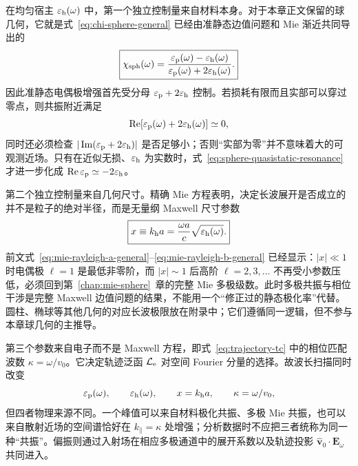 在均匀宿主 $\varepsilon_{\rm h}(\omega)$ 中，第一个独立控制量来自材料本身。对于本章正文保留的球几何，它就是式~\eqref{eq:chi-sphere-general} 已经由准静态边值问题和 Mie 渐近共同导出的
\begin{equation}
\boxed{
\chi_{\rm sph}(\omega)
=\frac{\varepsilon_{\rm p}(\omega)-\varepsilon_{\rm h}(\omega)}
{\varepsilon_{\rm p}(\omega)+2\varepsilon_{\rm h}(\omega)}.}
\label{eq:material-contrast-factors}
\end{equation}
因此准静态电偶极增强首先受分母
$\varepsilon_{\rm p}+2\varepsilon_{\rm h}$ 控制。若损耗有限而且实部可以穿过零点，则共振附近满足
\begin{equation}
\operatorname{Re}\!\left[\varepsilon_{\rm p}(\omega)+2\varepsilon_{\rm h}(\omega)\right]\simeq0,
\label{eq:sphere-quasistatic-resonance}
\end{equation}
同时还必须检查
$|\operatorname{Im}(\varepsilon_{\rm p}+2\varepsilon_{\rm h})|$
是否足够小；否则“实部为零”并不意味着大的可观测近场。只有在近似无损、$\varepsilon_{\rm h}$ 为实数时，式~\eqref{eq:sphere-quasistatic-resonance} 才进一步化成
$\operatorname{Re}\varepsilon_{\rm p}\simeq-2\varepsilon_{\rm h}$。

第二个独立控制量来自几何尺寸。精确 Mie 方程表明，决定长波展开是否成立的并不是粒子的绝对半径，而是无量纲 Maxwell 尺寸参数
\begin{equation}
\boxed{x\equiv k_{\rm h}a
=\frac{\omega a}{c}\sqrt{\varepsilon_{\rm h}(\omega)}.}
\label{eq:size-parameter-general}
\end{equation}
前文式~\eqref{eq:mie-rayleigh-a-general}--\eqref{eq:mie-rayleigh-b-general} 已经显示：$|x|\ll1$ 时电偶极 $\ell=1$ 是最低非零阶，而 $|x|\sim1$ 后高阶 $\ell=2,3,\ldots$ 不再受小参数压低，必须回到第~\ref{chap:mie-sphere}~章的完整 Mie 多极级数。此时多极共振与相位干涉是完整 Maxwell 边值问题的结果，不能用一个“修正过的静态极化率”代替。圆柱、椭球等其他几何的对应长波极限放在附录中；它们遵循同一逻辑，但不参与本章球几何的主推导。

第三个参数来自电子而不是 Maxwell 方程，即式~\eqref{eq:trajectory-tc} 中的相位匹配波数 $\kappa=\omega/v_0$。它决定轨迹泛函 $\mathcal L_{\rm e}$ 对空间 Fourier 分量的选择。故波长扫描同时改变
\begin{equation}
\varepsilon_{\rm p}(\omega),\qquad
\varepsilon_{\rm h}(\omega),\qquad
x=k_{\rm h}a,\qquad
\kappa=\omega/v_0,
\end{equation}
但四者物理来源不同。一个峰值可以来自材料极化共振、多极 Mie 共振，也可以来自散射近场的空间谱恰好在 $k_{\parallel}=\kappa$ 处增强；分析数据时不应把三者统称为同一种“共振”。偏振则通过入射场在相应多极通道中的展开系数以及轨迹投影 $\hat{\bm v}_0\cdot\bm E_\omega$ 共同进入。

